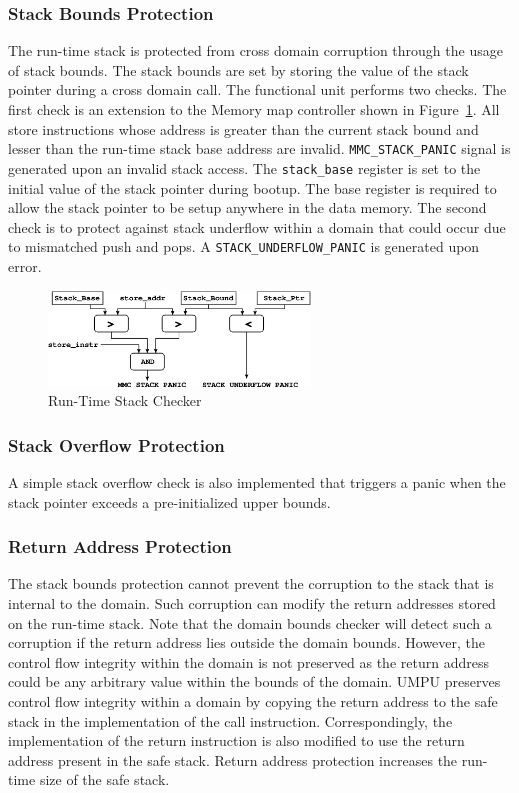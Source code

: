 \subsubsection{Stack Bounds Protection}
The run-time stack is protected from cross domain corruption through
the usage of stack bounds.
%
The stack bounds are set by storing the value of the stack pointer
during a cross domain call.
%
The functional unit performs two checks.
%
The first check is an extension to the Memory map controller shown in
Figure~\ref{fig:stackbndscheck}.
%
All store instructions whose address is greater than the current stack
bound and lesser than the run-time stack base address are invalid.
%
\texttt{MMC\_STACK\_PANIC} signal is generated upon an invalid stack
access.
%
The \texttt{stack\_base} register is set to the initial value
of the stack pointer during bootup.
%
The base register is required to allow the stack pointer to be setup
anywhere in the data memory.
%
The second check is to protect against stack underflow within a domain
that could occur due to mismatched push and pops.
%
A \texttt{STACK\_UNDERFLOW\_PANIC} is generated upon error.
%
\begin{figure}[htbp]
  \centering
  \includegraphics[height=1in,
  keepaspectratio=true]{figures/umpustackprot.eps} 
  \caption{Run-Time Stack Checker}
  \label{fig:stackbndscheck}
\end{figure}
%
\subsubsection{Stack Overflow Protection}
A simple stack overflow check is also implemented that
triggers a panic when the stack pointer exceeds a pre-initialized
upper bounds.
\subsubsection{Return Address Protection}
%
The stack bounds protection cannot prevent the corruption to the stack that is internal to the domain.
%
Such corruption can modify the return addresses stored on the run-time stack.
%
Note that the domain bounds checker will detect such a corruption if the return address lies outside the domain bounds.
%
However, the control flow integrity within the domain is not preserved as the return address could be any arbitrary value within the bounds of the domain.
%
UMPU preserves control flow integrity within a domain by copying the return address to the safe stack in the implementation of the call instruction.
%
Correspondingly, the implementation of the return instruction is also modified to use the return address present in the safe stack.
%
Return address protection increases the run-time size of the safe stack.
%
